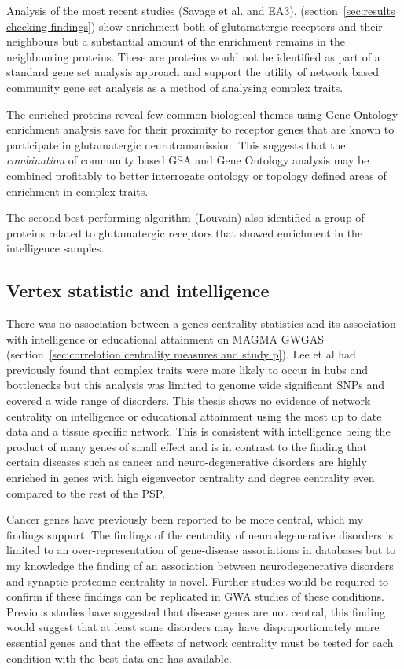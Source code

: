 Analysis of the most recent studies (Savage et al. and EA3)\cite{savage2018genome},\cite{lee2018gene} (section~\ref{sec:results checking findings}) show enrichment both of glutamatergic receptors and their neighbours but a substantial amount of the enrichment remains in the neighbouring proteins. These are proteins would not be identified as part of a standard gene set analysis approach and support the utility of network based community gene set analysis as a method of analysing complex traits. 

The enriched proteins reveal few common biological themes using Gene Ontology enrichment analysis save for their proximity to receptor genes that are known to participate in glutamatergic neurotransmission.
This suggests that the\textit{ combination} of community based GSA and Gene Ontology analysis may be combined profitably to better interrogate ontology or topology defined areas of enrichment in complex traits. 

The second best performing algorithm (Louvain) also identified a group of proteins related to glutamatergic receptors that showed enrichment in the intelligence samples. 


\subsection{Vertex statistic and intelligence}

There was no association between a genes centrality statistics and its association with intelligence or educational attainment on MAGMA GWGAS (section~\ref{sec:correlation centrality measures and study p}). Lee et al\cite{lee2013network} had previously found that complex traits were more likely to occur in hubs and bottlenecks but this analysis was limited to genome wide significant SNPs and covered a wide range of disorders. This thesis shows no evidence of network centrality on intelligence or educational attainment using the most up to date data and a tissue specific network. This is consistent with intelligence being the product of many genes of small effect and is in contrast to the finding that certain diseases such as cancer and neuro-degenerative disorders are highly enriched in genes with high eigenvector centrality and degree centrality even compared to the rest of the PSP.

Cancer genes have previously been reported to be more central\cite{wachi2005interactome},\cite{ozgur2008identifying} which my findings support. The findings of the centrality of neurodegenerative disorders is limited to an over-representation of gene-disease associations in databases but to my knowledge the finding of an association between neurodegenerative disorders and synaptic proteome centrality is novel. Further studies would be required to confirm if these findings can be replicated in GWA studies of these conditions. Previous studies have suggested that disease genes are not central\cite{barabasi2011network}, this finding would suggest that at least some disorders may have disproportionately more essential genes and that the effects of network centrality must be tested for each condition with the best data one has available. 


